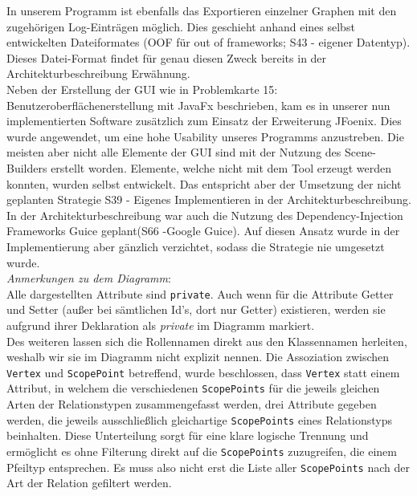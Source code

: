 \documentclass[enabledeprecatedfontcommands,fontsize=11pt,paper=a4,twoside]{scrartcl}
\newcounter{one}
\begin{document}
In unserem Programm ist ebenfalls das Exportieren einzelner Graphen mit den zugehörigen Log-Einträgen möglich. Dies geschieht anhand eines selbst entwickelten Dateiformates (OOF für \glqq out of frameworks\grqq; S43 - eigener Datentyp). Dieses Datei-Format findet für genau diesen Zweck bereits in der Architekturbeschreibung Erwähnung.  \\

Neben der Erstellung der GUI wie in Problemkarte 15: Benutzeroberflächenerstellung mit JavaFx beschrieben, kam es in unserer nun implementierten Software zusätzlich zum Einsatz der Erweiterung JFoenix. Dies wurde angewendet, um eine hohe Usability unseres Programms anzustreben. Die meisten aber nicht alle Elemente der GUI sind mit der Nutzung des Scene-Builders erstellt worden. Elemente, welche nicht mit dem Tool erzeugt werden konnten, wurden selbst entwickelt. Das entspricht aber der Umsetzung der nicht geplanten Strategie S39 - Eigenes Implementieren in der Architekturbeschreibung.\\

In der Architekturbeschreibung war auch die Nutzung des Dependency-Injection Frameworks Guice geplant(S66 -Google Guice). Auf diesen Ansatz wurde in der Implementierung aber gänzlich verzichtet, sodass die Strategie nie umgesetzt wurde.\\



\textit{Anmerkungen zu dem Diagramm}: \\
Alle dargestellten Attribute sind \texttt{private}. Auch wenn für die Attribute Getter und Setter (außer bei sämtlichen Id's, dort nur Getter) existieren, werden sie aufgrund ihrer Deklaration als \textit{private} im Diagramm markiert. \\
Des weiteren lassen sich die Rollennamen direkt aus den Klassennamen herleiten, weshalb wir sie im Diagramm nicht explizit nennen. Die Assoziation zwischen \texttt{Vertex} und \texttt{ScopePoint} betreffend, wurde beschlossen, dass \texttt{Vertex} statt einem Attribut, in welchem die verschiedenen \texttt{ScopePoints} für die jeweils gleichen Arten der Relationstypen zusammengefasst werden, drei Attribute gegeben werden, die jeweils ausschließlich gleichartige \texttt{ScopePoints} eines Relationstyps beinhalten. Diese Unterteilung sorgt für eine klare logische Trennung und ermöglicht es ohne Filterung direkt auf die \texttt{ScopePoints} zuzugreifen, die einem Pfeiltyp entsprechen. Es muss also nicht erst die Liste aller \texttt{ScopePoints} nach der Art der Relation gefiltert werden.\\



\end{document}
